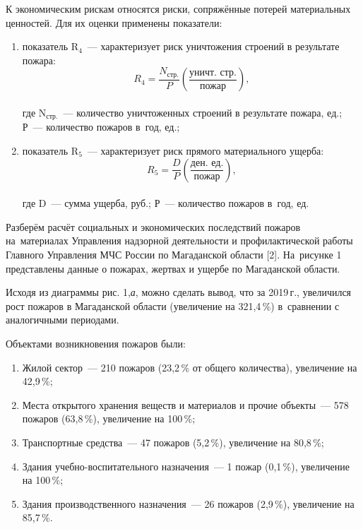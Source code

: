 К экономическим рискам относятся риски, сопряжённые потерей материальных ценностей. Для их оценки применены показатели:
\begin{enumerate}[noitemsep]\vspace{-8pt}
  \item показатель R$_4$~--- характеризует риск уничтожения строений в результате пожара:\\
  $$R_{4}=\frac{N_\text{стр.}}{P}\left(\dfrac{\text{уничт. стр.}}{\text{пожар}}\right),$$\\
  где N$_\text{стр.}$~---  количество уничтоженных строений в результате пожара, ед.; Р~--- количество пожаров в~год, ед.;
  \item показатель R$_5$~--- характеризует риск прямого материального ущерба:\\
  $$R_{5}=\frac{D}{P}\left(\dfrac{\text{ден. ед.}}{\text{пожар}}\right),$$\\
    где D~--- сумма ущерба, руб.; Р~--- количество пожаров в~год, ед.
\end{enumerate}
 \vspace{-8pt}

 Разберём расчёт социальных и экономических последствий пожаров на~материалах Управления надзорной деятельности и профилактической работы Главного Управления МЧС России по Магаданской области [2]. На~рисунке 1 представлены данные о пожарах, жертвах и ущербе по Магаданской области.



Исходя из диаграммы рис. 1,\textit{а}, можно сделать вывод, что за 2019\,г., увеличился рост пожаров в Магаданской области (увеличение на 321,4\,\%) в~сравнении с аналогичными периодами.

Объектами возникновения пожаров были:
\begin{enumerate}[noitemsep]\vspace{-8pt}
  \item Жилой сектор~--- 210 пожаров (23,2\,\% от общего количества), увеличение на 42,9\,\%;
    \item Места открытого хранения веществ и материалов и прочие объекты~--- 578 пожаров (63,8\,\%), увеличение на 100\,\%;
      \item Транспортные средства~--- 47 пожаров (5,2\,\%), увеличение на 80,8\,\%;
        \item Здания учебно-воспитательного назначения~--- 1 пожар (0,1\,\%), увеличение на 100\,\%;
          \item Здания производственного назначения~--- 26 пожаров (2,9\,\%), увеличение на 85,7\,\%.
\end{enumerate}
 \vspace{-8pt}

